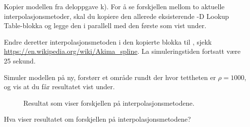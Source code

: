 

\item[l)]
  Kopier modellen fra deloppgave k). For å se forskjellen mellom to aktuelle
  interpolasjonsmetoder, skal du kopiere
  den allerede eksisterende {-D Lookup  Table}-blokka og
  legge den i parallell med den første som vist under.
  \begin{figure}[H]
    \centering
    \hspace*{0mm}
  \end{figure}
Endre deretter interpolasjonsmetoden i den kopierte blokka
  til  , sjekk
  {\color{blue}\href{https://en.wikipedia.org/wiki/Akima_spline} 
    {https://en.wikipedia.org/wiki/Akima\_spline}}.
  {\color{red}La simuleringstiden fortsatt være 25 sekund.  }

Simuler modellen på ny, forstørr et område rundt der hvor tettheten er
$\rho{=}1000$, og vis at du får resultatet vist under.
  \begin{figure}[H]
    \centering
    \hspace*{0mm}
    \caption{Resultat som viser forskjellen på
      interpolasjonsmetodene.}
    \label{fig:akima}
  \end{figure}

  Hva viser resultatet om forskjellen på interpolasjonsmetodene?